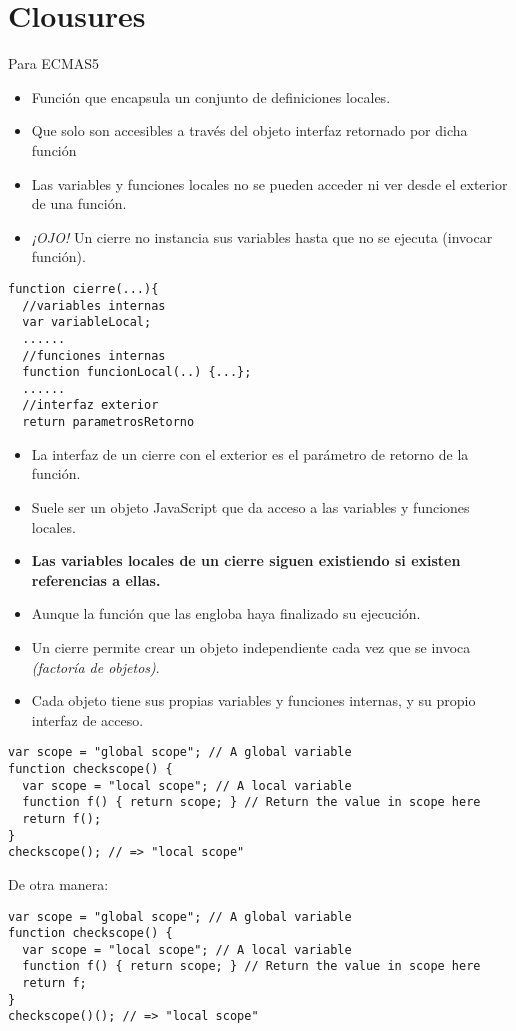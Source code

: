 \documentclass[4paper]{article}
\begin{document}
\section{Clousures}
Para ECMAS5
\begin{itemize}
\item Función que encapsula un conjunto de definiciones locales.
\item Que solo son accesibles a través del objeto interfaz retornado por dicha función
\item Las variables y funciones locales no se pueden acceder ni ver desde el exterior de una función.
\item \emph{¡OJO!} Un cierre no instancia sus variables hasta que no se ejecuta (invocar función).
\end{itemize}
\begin{lstlisting}
function cierre(...){
  //variables internas
  var variableLocal; 
  ......
  //funciones internas
  function funcionLocal(..) {...};
  ......
  //interfaz exterior
  return parametrosRetorno
\end{lstlisting}
\begin{itemize}
\item La interfaz de un cierre con el exterior es el parámetro de retorno de la función.
\item Suele ser un objeto JavaScript que da acceso a las variables y funciones locales.
\item \textbf{Las variables locales de un cierre siguen existiendo si existen referencias a ellas.}
\item Aunque la función que las engloba haya finalizado su ejecución.
\item Un cierre permite crear un objeto independiente cada vez que se invoca \textit{(factoría de objetos)}.
\item Cada objeto tiene sus propias variables y funciones internas, y su propio interfaz de acceso.
\end{itemize}
\begin{lstlisting}
var scope = "global scope"; // A global variable
function checkscope() { 
  var scope = "local scope"; // A local variable
  function f() { return scope; } // Return the value in scope here
  return f(); 
}
checkscope(); // => "local scope"
\end{lstlisting}
\newpage
De otra manera:
\begin{lstlisting}
var scope = "global scope"; // A global variable
function checkscope() { 
  var scope = "local scope"; // A local variable
  function f() { return scope; } // Return the value in scope here
  return f; 
}
checkscope()(); // => "local scope"
\end{lstlisting}
\end{document}
